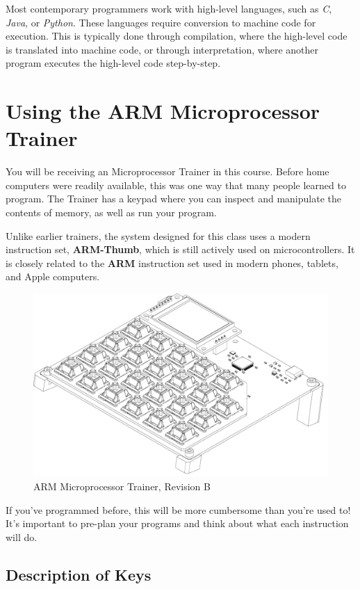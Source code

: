 \documentclass[12pt]{article}
\begin{document}
Most contemporary programmers work with high-level languages, such as \textit{C}, \textit{Java}, or \textit{Python}. These languages require conversion to machine code for execution. This is typically done through compilation, where the high-level code is translated into machine code, or through interpretation, where another program executes the high-level code step-by-step.

\newpage

\section{Using the ARM Microprocessor Trainer}

You will be receiving an Microprocessor Trainer in this course. Before home computers were readily available, this was one way that many people learned to program. The Trainer has a keypad where you can inspect and manipulate the contents of memory, as well as run your program.

Unlike earlier trainers, the system designed for this class uses a modern instruction set, \textbf{ARM-Thumb}, which is still actively used on microcontrollers. It is closely related to the \textbf{ARM} instruction set used in modern phones, tablets, and Apple computers.

\begin{figure}[h]
    \includegraphics[width=13cm]{mptrainer.pdf}    
    \centering
    \caption{ARM Microprocessor Trainer, Revision B}
\end{figure}

If you've programmed before, this will be more cumbersome than you're used to! It's important to pre-plan your programs and think about what each instruction will do.

\subsection{Description of Keys}
\end{document}
